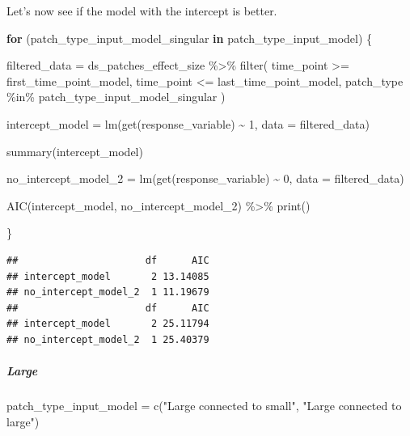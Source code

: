 \documentclass[
]{article}
\newenvironment{Shaded}{\begin{snugshade}}{\end{snugshade}}
\newcommand{\AttributeTok}[1]{\textcolor[rgb]{0.77,0.63,0.00}{#1}}
\newcommand{\ControlFlowTok}[1]{\textcolor[rgb]{0.13,0.29,0.53}{\textbf{#1}}}
\newcommand{\DecValTok}[1]{\textcolor[rgb]{0.00,0.00,0.81}{#1}}
\newcommand{\FunctionTok}[1]{\textcolor[rgb]{0.00,0.00,0.00}{#1}}
\newcommand{\NormalTok}[1]{#1}
\newcommand{\OtherTok}[1]{\textcolor[rgb]{0.56,0.35,0.01}{#1}}
\newcommand{\SpecialCharTok}[1]{\textcolor[rgb]{0.00,0.00,0.00}{#1}}
\newcommand{\StringTok}[1]{\textcolor[rgb]{0.31,0.60,0.02}{#1}}
\begin{document}
Let's now see if the model with the intercept is better.

\begin{Shaded}
\begin{Highlighting}[]
\ControlFlowTok{for}\NormalTok{ (patch\_type\_input\_model\_singular }\ControlFlowTok{in}\NormalTok{ patch\_type\_input\_model) \{}
  
\NormalTok{  filtered\_data }\OtherTok{=}\NormalTok{ ds\_patches\_effect\_size }\SpecialCharTok{\%\textgreater{}\%}
    \FunctionTok{filter}\NormalTok{(}
\NormalTok{        time\_point }\SpecialCharTok{\textgreater{}=}\NormalTok{ first\_time\_point\_model,}
\NormalTok{        time\_point }\SpecialCharTok{\textless{}=}\NormalTok{ last\_time\_point\_model,}
\NormalTok{        patch\_type }\SpecialCharTok{\%in\%}\NormalTok{ patch\_type\_input\_model\_singular}
\NormalTok{    )}
  
\NormalTok{  intercept\_model }\OtherTok{=} \FunctionTok{lm}\NormalTok{(}\FunctionTok{get}\NormalTok{(response\_variable) }\SpecialCharTok{\textasciitilde{}}
                         \DecValTok{1}\NormalTok{,}
                       \AttributeTok{data =}\NormalTok{ filtered\_data)}
  
  \FunctionTok{summary}\NormalTok{(intercept\_model)}
  
\NormalTok{  no\_intercept\_model\_2 }\OtherTok{=} \FunctionTok{lm}\NormalTok{(}\FunctionTok{get}\NormalTok{(response\_variable) }\SpecialCharTok{\textasciitilde{}}
                              \DecValTok{0}\NormalTok{,}
                            \AttributeTok{data =}\NormalTok{ filtered\_data)}
  
  \FunctionTok{AIC}\NormalTok{(intercept\_model, no\_intercept\_model\_2) }\SpecialCharTok{\%\textgreater{}\%}
    \FunctionTok{print}\NormalTok{()}
  
\NormalTok{\}}
\end{Highlighting}
\end{Shaded}

\begin{verbatim}
##                      df      AIC
## intercept_model       2 13.14085
## no_intercept_model_2  1 11.19679
##                      df      AIC
## intercept_model       2 25.11794
## no_intercept_model_2  1 25.40379
\end{verbatim}

\hypertarget{large-2}{%
\subparagraph{Large}\label{large-2}}

\begin{Shaded}
\begin{Highlighting}[]
\NormalTok{patch\_type\_input\_model }\OtherTok{=} \FunctionTok{c}\NormalTok{(}\StringTok{"Large connected to small"}\NormalTok{,}
                           \StringTok{"Large connected to large"}\NormalTok{)}
\end{Highlighting}
\end{Shaded}
\end{document}
